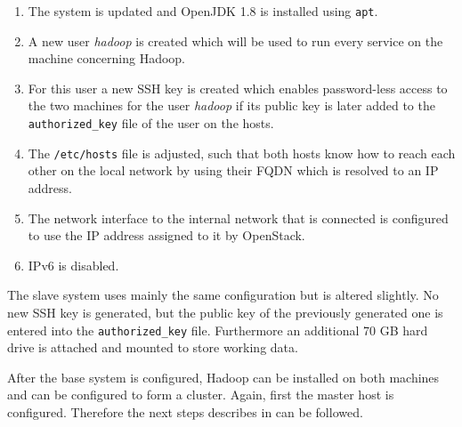 \begin{enumerate}
    \item The system is updated and OpenJDK 1.8   is installed using \texttt{apt}. 
    \item A new user \emph{hadoop} is created which will be used to run every service on the machine concerning Hadoop.
    \item For this user a new \ac{SSH} key is created which enables password-less access to the two machines for the user \emph{hadoop} if its public key is later added to the \texttt{authorized\_key} file of the user on the hosts.
    \item The \texttt{/etc/hosts} file is adjusted, such that both hosts know how to reach each other on the local network by using their \acs{FQDN} which is resolved to an \ac{IP} address.
    \item The network interface to the internal network that is connected is configured to use the \ac{IP} address assigned to it by OpenStack.
    \item \ac{IP}v6 is disabled.
\end{enumerate}

The slave system uses mainly the same configuration but is altered slightly.
No new \ac{SSH} key is generated, but the public key of the previously
generated one is entered into the \texttt{authorized\_key} file. 
Furthermore an additional 70 \ac{GB} hard drive is attached 
and mounted to store working data.

After the base system is configured, Hadoop can be installed on both machines
and can be configured to form a cluster.
Again, first the master host is configured.
Therefore the next steps describes in 
\autocite[][Appendix A]{white2015hadoop}
can be followed.

